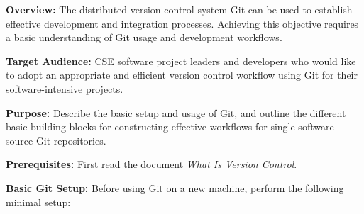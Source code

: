 \documentclass[]{article}
\date{}
\begin{document}
\pagestyle{fancy}
\renewcommand{\headrulewidth}{0pt}
  
\thispagestyle{empty}
\textbf{\newline}
\textbf{\newline}

\textbf{Overview:} The distributed version control system Git can be
used to establish effective development and integration processes.
Achieving this objective requires a basic understanding of Git usage and
development workflows.

\textbf{Target Audience:} CSE software project leaders and developers
who would like to adopt an appropriate and efficient version control
workflow using Git for their software-intensive projects.

\textbf{Purpose:} Describe the basic setup and usage of Git, and outline
the different basic building blocks for constructing effective workflows
for single software source Git repositories.

\textbf{Prerequisites:} First read the document
\href{https://docs.google.com/document/d/1LHT4e-BjB31BcCSL42xSI5GBNCNpQ-SS5K5iyStH6sw}{\emph{What
Is Version Control}}.

\textbf{Basic Git Setup:} Before using Git on a new machine, perform the
following minimal setup:
\end{document}
